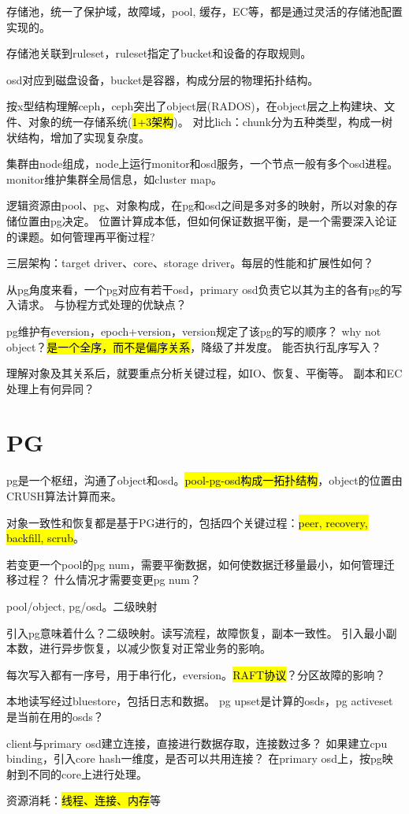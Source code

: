 存储池，统一了保护域，故障域，pool, 缓存，EC等，都是通过灵活的存储池配置实现的。

存储池关联到ruleset，ruleset指定了bucket和设备的存取规则。

osd对应到磁盘设备，bucket是容器，构成分层的物理拓扑结构。

按x型结构理解ceph，ceph突出了object层(RADOS)，在object层之上构建块、文件、对象的统一存储系统(\hl{1+3架构})。
对比lich：chunk分为五种类型，构成一树状结构，增加了实现复杂度。

集群由node组成，node上运行monitor和osd服务，一个节点一般有多个osd进程。
monitor维护集群全局信息，如cluster map。

逻辑资源由pool、pg、对象构成，在pg和osd之间是多对多的映射，所以对象的存储位置由pg决定。
位置计算成本低，但如何保证数据平衡，是一个需要深入论证的课题。如何管理再平衡过程?

三层架构：target driver、core、storage driver。每层的性能和扩展性如何？

从pg角度来看，一个pg对应有若干osd，primary osd负责它以其为主的各有pg的写入请求。
与协程方式处理的优缺点？

pg维护有eversion，epoch+version，version规定了该pg的写的顺序？
why not object？\hl{是一个全序，而不是偏序关系}，降级了并发度。
能否执行乱序写入？

理解对象及其关系后，就要重点分析关键过程，如IO、恢复、平衡等。
副本和EC处理上有何异同？

\section{PG}

pg是一个枢纽，沟通了object和osd。\hl{pool-pg-osd构成一拓扑结构}，object的位置由CRUSH算法计算而来。

对象一致性和恢复都是基于PG进行的，包括四个关键过程：\hl{peer, recovery, backfill, scrub}。

若变更一个pool的pg num，需要平衡数据，如何使数据迁移量最小，如何管理迁移过程？
什么情况才需要变更pg num？

pool/object, pg/osd。二级映射

引入pg意味着什么？二级映射。读写流程，故障恢复，副本一致性。
引入最小副本数，进行异步恢复，以减少恢复对正常业务的影响。

每次写入都有一序号，用于串行化，eversion。\hl{RAFT协议}？分区故障的影响？

本地读写经过bluestore，包括日志和数据。
pg upset是计算的osds，pg activeset是当前在用的osds？

client与primary osd建立连接，直接进行数据存取，连接数过多？
如果建立cpu binding，引入core hash一维度，是否可以共用连接？
在primary osd上，按pg映射到不同的core上进行处理。

资源消耗：\hl{线程、连接、内存}等
